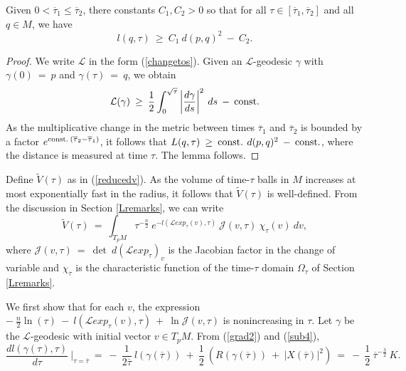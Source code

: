 \begin{lemma}
  \label{lem:kl-monotonicity-reduced-volume-estimates-reduced-volume}
 \label{lowerbound}
Given $0 < \overline{\tau}_1 \le \overline{\tau}_2$,
there constants $C_1, C_2 > 0$ so that for all $\tau \in
[\overline{\tau}_1, \overline{\tau}_2]$ and all
$q \in M$, we have
\begin{equation} \label{lbound}
l(q, \tau) \: \ge \:
C_1 \: d(p,q)^2 \:
- \: C_2.
\end{equation}
\end{lemma}
\begin{proof}
We write ${\mathcal L}$ in the form (\ref{changetos}).
Given an ${\mathcal L}$-geodesic $\gamma$ with
$\gamma(0) \: = \: p$ and $\gamma({\tau}) \: = \: q$, we obtain
\begin{equation}
{\mathcal L}(\gamma) \: \ge \:
\frac12 \int_0^{\sqrt{\tau}} \left| \frac{d\gamma}{ds} \right|^2 \: ds \:
- \: \operatorname{const.}
\end{equation}
As the multiplicative change in the metric between times
$\overline{\tau}_1$ and $\overline{\tau}_2$ is bounded by a factor
$e^{\operatorname{const.} \: (\overline{\tau}_2 - \overline{\tau}_1)}$, it follows that
$L(q, \tau) \: \ge \:
\operatorname{const.} \: d(p,q)^2 \:
- \: \operatorname{const.}$, where the distance is measured at time $\tau$.
The lemma follows.
\end{proof}

Define
$\tilde{V}(\tau)$
as in (\ref{reducedv}).
As the volume of time-$\tau$ balls in $M$ increases at most
exponentially fast in the radius, it follows that
$\tilde{V}(\tau)$ is well-defined.
From the discussion in Section \ref{Lremarks}, we can write
\begin{equation}
\tilde{V}(\tau) \: = \: \int_{T_pM} \tau^{-\frac{n}{2}} \:
e^{-l({\mathcal L}exp_\tau(v),\tau)} \: {\mathcal J}(v, \tau) \:
\chi_{\tau}(v) \:
dv,
\end{equation}
where ${\mathcal J}(v, \tau) \: = \:
\det \: d\left( {\mathcal L}exp_\tau \right)_v$ is the Jacobian factor
in the change of variable and
$\chi_\tau$ is the characteristic function of the
time-$\tau$ domain $\Omega_\tau$ of Section \ref{Lremarks}.

We first show
that for each $v$, the expression
$- \: \frac{n}{2} \ln(\tau) \:
- \: l({\mathcal L}exp_\tau(v), \tau) \: + \: \ln {\mathcal J}(v, \tau)$ is
nonincreasing in $\tau$. Let $\gamma$ be the ${\mathcal L}$-geodesic
with initial vector $v \in T_pM$.
From (\ref{grad2}) and (\ref{sub4}),
\begin{equation} \label{bbound1}
\frac{dl(\gamma(\tau), \tau)}{d\tau} \: \Big|_{\tau = \overline{\tau}} \: = \:
- \: \frac{1}{2\overline{\tau}} \: l(\gamma(\overline{\tau})) \: + \:
\frac12 \: \left( R(\gamma(\overline{\tau})) \: + \:
|X(\overline{\tau})|^2 \right) \: =\:
- \: \frac12 \: \overline{\tau}^{-\frac32} \: K.
\end{equation}

